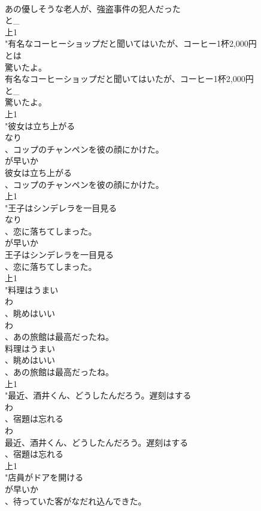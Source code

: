 \documentclass[8pt]{extreport}
\begin{document}
\begin{CJK}{UTF8}{min}
\\	あの優しそうな老人が、強盗事件の犯人だった
\\	と_
\\	上1
\\	"有名なコーヒーショップだと聞いてはいたが、コーヒー1杯2,000円
\\	とは
\\	驚いたよ。
\\	有名なコーヒーショップだと聞いてはいたが、コーヒー1杯2,000円
\\	と_
\\	驚いたよ。
\\	上1
\\	"彼女は立ち上がる
\\	なり
\\	、コップのチャンペンを彼の顔にかけた。
\\	が早いか
\\	彼女は立ち上がる
\\	、コップのチャンペンを彼の顔にかけた。
\\	上1
\\	"王子はシンデレラを一目見る
\\	なり
\\	、恋に落ちてしまった。
\\	が早いか
\\	王子はシンデレラを一目見る
\\	、恋に落ちてしまった。
\\	上1
\\	"料理はうまい
\\	わ
\\	、眺めはいい
\\	わ
\\	、あの旅館は最高だったね。
\\	料理はうまい
\\	、眺めはいい
\\	、あの旅館は最高だったね。
\\	上1
\\	"最近、酒井くん、どうしたんだろう。遅刻はする
\\	わ
\\	、宿題は忘れる
\\	わ
\\	最近、酒井くん、どうしたんだろう。遅刻はする
\\	、宿題は忘れる
\\	上1
\\	"店員がドアを開ける
\\	が早いか
\\	、待っていた客がなだれ込んできた。

\end{CJK}
\end{document}
